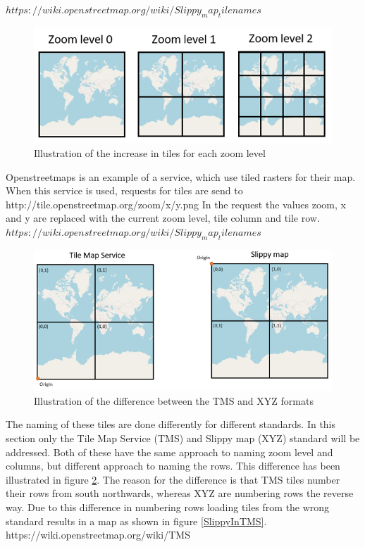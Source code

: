 $https://wiki.openstreetmap.org/wiki/Slippy_map_tilenames$
 

\begin{figure} [H]
	\centering
	\includegraphics[width=.8\textwidth]{Pictures/TilesPerZoomLevel}
	\caption{Illustration of the increase in tiles for each zoom level}
	\label{TilesPerZoomLevel}
\end{figure}

Openstreetmaps is an example of a service, which use tiled rasters for their map. When this service is used, requests for tiles are send to 
http://tile.openstreetmap.org/zoom/x/y.png
In the request the values zoom, x and y are replaced with the current zoom level, tile column and tile row.
$https://wiki.openstreetmap.org/wiki/Slippy_map_tilenames$
 
 \begin{figure} [H]
 	\centering
 	\includegraphics[width=.8\textwidth]{Pictures/TMSXYZ}
 	\caption{Illustration of the difference between the TMS and XYZ formats}
 	\label{TMSXYZ}
 \end{figure}
 

The naming of these tiles are done differently for different standards. In this section only the Tile Map Service (TMS) and Slippy map (XYZ) standard will be addressed. Both of these have the same approach to naming zoom level and columns, but different approach to naming the rows. This difference has been illustrated in figure \ref{TMSXYZ}. The reason for the difference is that TMS tiles number their rows from south northwards, whereas XYZ are numbering rows the reverse way. Due to this difference in numbering rows loading tiles from the wrong standard results in a map as shown in figure \ref{SlippyInTMS}.
https://wiki.openstreetmap.org/wiki/TMS 
 
